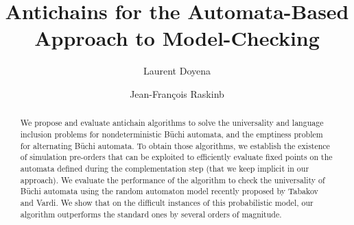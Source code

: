 \documentclass{LMCS}
\begin{document}
\title[]{Antichains for the Automata-Based Approach to Model-Checking\rsuper*}

\author[L.~Doyen]{Laurent Doyen\rsuper a} \address{{\lsuper a}CCS,
  \'{E}cole Polytechnique F\'ed\'erale de Lausanne, Switzerland}



\author[J.-F.~Raskin]{Jean-Fran\c{c}ois Raskin\rsuper b}	\address{{\lsuper b}CS, Universit\'{e} Libre de Bruxelles, Belgium}	  






\begin{abstract}
  We propose and evaluate antichain algorithms to solve the universality and
  language inclusion problems for nondeterministic B\"uchi automata,
  and the emptiness problem for alternating B\"uchi automata.
  To obtain those algorithms, we establish the existence of
  simulation pre-orders that can be exploited to efficiently evaluate fixed
  points on the automata defined during the complementation step (that
  we keep implicit in our approach). We evaluate the performance of the
  algorithm to check the universality of B\"uchi automata
  using the random automaton model recently proposed by
  Tabakov and Vardi.  We show that on the difficult instances of this
  probabilistic model, our algorithm outperforms the standard ones by
  several orders of magnitude. 
\end{abstract} 

\maketitle
\end{document}
